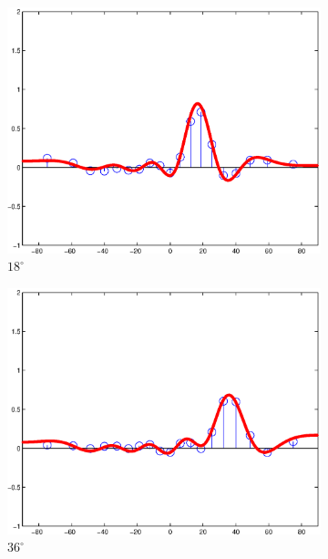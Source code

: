 \documentclass[spanish,openright]{book}
\begin{document}
\begin{figure}
\begin{subfigure}[b]{0.3\textwidth}
\includegraphics[width=\textwidth]{Sim_seg025_ang108}
\caption{$18^{\circ}$}
\label{fig:Sim_ang108}
\end{subfigure}
\begin{subfigure}[b]{0.3\textwidth}
\includegraphics[width=\textwidth]{Sim_seg025_ang126}
\caption{$36^{\circ}$}
\label{fig:Sim_ang126}
\end{subfigure}
\begin{subfigure}[b]{0.3\textwidth}

\end{subfigure}
\end{figure}
\end{document}
